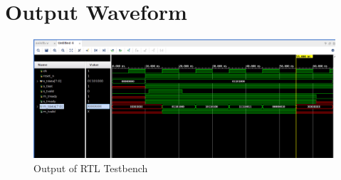 \documentclass{article}
\begin{document}
\vspace{12cm}

\section{Output Waveform}
\vspace{1cm}
\begin{figure}[h]
    \centering
\includegraphics[width=\columnwidth]{figs/p2rtlwav.png}
    \caption{Output of RTL Testbench}
    \label{fig:my_label}
\end{figure}
\vspace{1cm}
\end{document}
